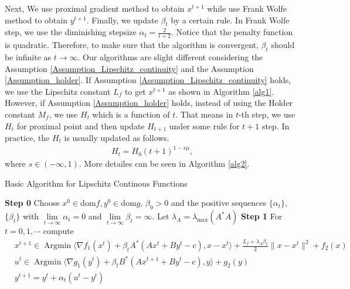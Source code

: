 \documentclass{article}
\numberwithin{equation}{section}
\def\Argmin{\mathop{\mathrm{Argmin}}}
\begin{document}
Next, We use proximal gradient method to obtain $x^{t+1}$ while use Frank
Wolfe method to obtain $y^{t+1}$. Finally, we update $\beta_t$ by a certain rule. In Frank Wolfe step, we use the diminishing 
stepsize $\alpha_t = \frac{2}{t+2}$. Notice that the penalty function 
is quadratic. Therefore, to make sure that the algorithm is convergent, $\beta_t$ should be infinite 
as $t\rightarrow \infty$. Our algorithms are slight different considering the Assumption \ref{Assumption_Lipschitz_continuity} 
and the Assumption \ref{Assumption_holder}. 
If Assumption \ref{Assumption_Lipschitz_continuity} holds, we use the Lipschitz constant $L_f$ to get $x^{t+1}$ 
as shown in Algorithm \ref{alg1}. However, if Assumption \ref{Assumption_holder} holds, instead of using the 
Holder constant $M_f$, we use $H_t$ which is a function of $t$. That means in $t$-th step, we use $H_t$ for 
proximal point and then update $H_{t+1}$ under some rule for $t+1$ step. In practice, the $H_{t}$ is usually 
updated as follows. 
\begin{align}
    H_{t} = H_0(t+1)^{1-s\mu} \label{definition_Ht}, 
\end{align} 
where $s \in (-\infty,1)$. 
More detailes can be seen in Algorithm \ref{alg2}.

\begin{algorithm}
	\caption{Basic Algorithm for Lipschitz Continous Functions}
	\label{alg1}
	\begin{algorithmic}
		\STATE \textbf{Step 0} Choose $x^0 \in \mathrm{dom} f, y^0 \in \mathrm{dom} g$, $\beta_0>0$ and the positive sequences $\{\alpha_t\}$, $\{\beta_t\}$ 
        with $\lim\limits_{t\rightarrow\infty}\alpha_t=0$ and $\lim\limits_{t\rightarrow \infty}\beta_t=\infty $. 
        Let $\lambda_{A}=\lambda_{\max}(A^*A)$
		\STATE \textbf{Step 1} For $t=0,1,\cdots$ compute   
            \begin{align}
                &x^{t+1} \in \Argmin \langle \nabla f_1(x^t) + \beta_{t}A^*(Ax^t+By^t-c), x-x^t\rangle +\frac{L_f+\lambda_A \beta_t}{2}\|x-x^t\rVert^2 +f_2(x) \label{get_x_k} \\
                &u^t \in \Argmin \langle\nabla g_1(y^t) + \beta_{t}B^*(Ax^{t+1} +By^t-c),y\rangle +g_2(y) \label{get_uk}  \\
                &y^{t+1} = y^t +\alpha_t(u^t-y^t) \label{get_yk_holder} 
            \end{align}
	\end{algorithmic}  
\end{algorithm}
\end{document}
